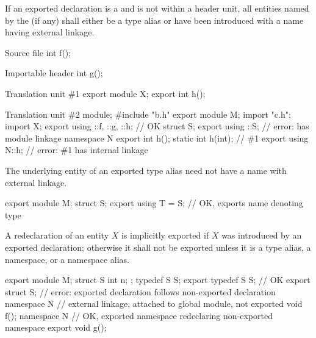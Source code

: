 \pnum
If an exported declaration is a 
and is not within a header unit,
all entities named by the
 (if any)
shall either be a type alias or
have been introduced with a name having external linkage.
\begin{example}
\begin{codeblocktu}{Source file }
int f();
\end{codeblocktu}

\begin{codeblocktu}{Importable header }
int g();
\end{codeblocktu}

\begin{codeblocktu}{Translation unit \#1}
export module X;
export int h();
\end{codeblocktu}

\begin{codeblocktu}{Translation unit \#2}
module;
#include "b.h"
export module M;
import "c.h";
import X;
export using ::f, ::g, ::h;     // OK
struct S;
export using ::S;               // error:  has module linkage
namespace N {
  export int h();
  static int h(int);            // \#1
}
export using N::h;              // error: \#1 has internal linkage
\end{codeblocktu}
\end{example}
\begin{note}
The underlying entity of an exported type alias
need not have a name with external linkage.
\begin{example}
\begin{codeblock}
export module M;
struct S;
export using T = S;             // OK, exports name  denoting type 
\end{codeblock}
\end{example}
\end{note}

\pnum
A redeclaration of an entity $X$
is implicitly exported
if $X$ was introduced by an exported declaration;
otherwise it shall not be exported
unless it is a type alias, a namespace, or a namespace alias.
\begin{example}
\begin{codeblock}
export module M;
struct S { int n; };
typedef S S;
export typedef S S;             // OK
export struct S;                // error: exported declaration follows non-exported declaration
namespace N {                   // external linkage, attached to global module, not exported
  void f();
}
namespace N {                   // OK, exported namespace redeclaring non-exported namespace
  export void g();
}
\end{codeblock}
\end{example}

